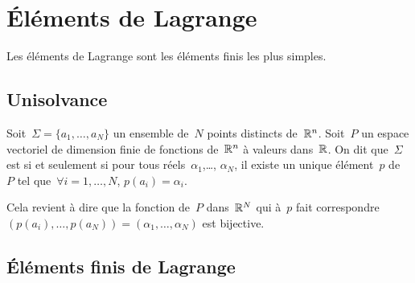 \medskip
\section{Éléments de Lagrange}

Les éléments de Lagrange sont les éléments finis les plus simples.

\medskip
\subsection{Unisolvance}\label{Sec-unisolvance}

\begin{definition}[Unisolvance]
Soit~$\Sigma=\{a_1,\ldots, a_N\}$ un ensemble de~$N$ points distincts de~$\mathbb R^n$.
Soit~$P$ un espace vectoriel de dimension finie de fonctions de~$\mathbb R^n$ à valeurs dans~$\mathbb R$.
On dit que~$\Sigma$ est  si et seulement si pour tous réels~$\alpha_1$,\ldots, $\alpha_N$, il existe un unique élément~$p$ de~$P$ tel que~$\forall i=1,\ldots, N$, $p(a_i) = \alpha_i$.

Cela revient à dire que la fonction de~$P$ dans~$\mathbb R^N$ qui à~$p$ fait correspondre $(p(a_i),\ldots, p(a_N))=(\alpha_1,\ldots, \alpha_N)$ est bijective.
\end{definition}

\ifVersionDuDocEstVincent\newpage\else\medskip\fi
\subsection{Éléments finis de Lagrange}

